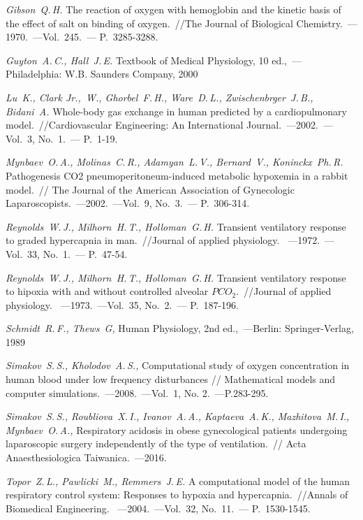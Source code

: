 \begin{thebibliography}{}
	 {\it Gibson~Q.\,H.} The reaction of oxygen with hemoglobin and the kinetic basis of the effect of salt on binding of oxygen.~//The Journal of Biological Chemistry.~---1970.~---Vol.~245.~--- P.~3285-3288.
	
	 {\it Guyton~A.\,C., Hall~J.\,E.} Textbook of Medical Physiology, 10 ed.,~---Philadelphia:  W.B. Saunders Company, 2000
	
	 {\it Lu~K., Clark Jr.,~W., Ghorbel~F.\,H., Ware~D.\,L., Zwischenbrger~J.\,B., Bidani~A.} Whole-body gas exchange in human predicted by a cardiopulmonary model.~//Cardiovascular Engineering: An International Journal.~---2002.~---Vol.~3, No.~1.~--- P.~1-19.
	

	 {\it Mynbaev~O.\,A., Molinas~C.\,R., Adamyan~L.\,V., Bernard~V., Koninckx~Ph.\,R.}
	Pathogenesis CO2 pneumoperitoneum-induced metabolic hypoxemia in a rabbit model.~// The Journal of the American Association of Gynecologic Laparoscopists.~---2002.~---Vol.~9, No.~3.~--- P.~306-314.
	
	
	 {\it Reynolds~W.\,J., Milhorn~H.\,T., Holloman~G.\,H.} Transient ventilatory response to graded hypercapnia in man.~//Journal of applied physiology. ~---1972.~---Vol.~33, No.~1.~--- P.~47-54.
	
	 {\it Reynolds~W.\,J., Milhorn~H.\,T., Holloman~G.\,H.} Transient ventilatory response to hipoxia with and without controlled alveolar \(PCO_{2}\).~//Journal of applied physiology. ~---1973.~---Vol.~35, No.~2.~--- P.~187-196.
	
	 {\it Schmidt~R.\,F., Thews~G,} Human Physiology, 2nd ed.,~---Berlin:  Springer-Verlag, 1989
	
	 {\it Simakov~S.\,S., Kholodov~A.\,S.,} Computational study of oxygen concentration in human 	blood under low frequency disturbances // Mathematical models and computer simulations.~---2008.~---Vol.~1, No. 2.~---P.283-295.

	 {\it Simakov~S.\,S.,  Roubliova~X.\,I., Ivanov~A.\,A., Kaptaeva~A.\,K., Mazhitova~M.\,I., Mynbaev~O.\,A.,} Respiratory acidosis in obese gynecological patients undergoing laparoscopic surgery independently of the type of ventilation.~// Acta Anaesthesiologica Taiwanica.~---2016.
	
	 {\it Topor~Z.\,L., Pawlicki~M., Remmers~J.\,E.} A computational model of the human respiratory control system: Responses to hypoxia and hypercapnia.~//Annals of Biomedical Engineering. ~---2004.~---Vol.~32, No.~11.~--- P.~1530-1545.
		

\end{thebibliography}
